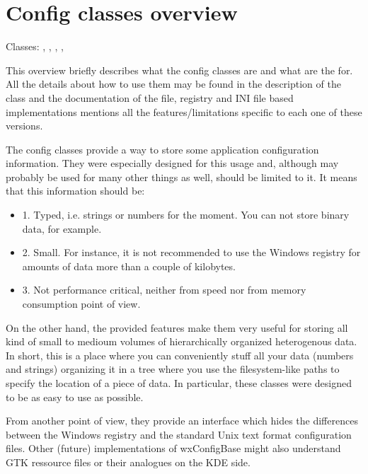 \section{Config classes overview}\label{wxconfigoverview}

Classes: , ,
, ,

This overview briefly describes what the config classes are and what are the
for. All the details about how to use them may be found in the description of
the  class and the documentation of the
file, registry and INI file based implementations mentions all the
features/limitations specific to each one of these versions.

The config classes provide a way to store some application configuration
information. They were especially designed for this usage and, although may
probably be used for many other things as well, should be limited to it. It
means that this information should be:
\begin{itemize}
\item{1.} Typed, i.e. strings or numbers for the moment. You can not store
binary data, for example.
\item{2.} Small. For instance, it is not recommended to use the Windows
registry for amounts of data more than a couple of kilobytes.
\item{3.} Not performance critical, neither from speed nor from memory
consumption point of view.
\end{itemize}

On the other hand, the provided features make them very useful for storing all
kind of small to medioum volumes of hierarchically organized heterogenous
data. In short, this is a place where you can conveniently stuff all your data
(numbers and strings) organizing it in a tree where you use the
filesystem-like paths to specify the location of a piece of data. In
particular, these classes were designed to be as easy to use as possible.

From another point of view, they provide an interface which hides the
differences between the Windows registry and the standard Unix text format
configuration files. Other (future) implementations of wxConfigBase might also
understand GTK ressource files or their analogues on the KDE side.

